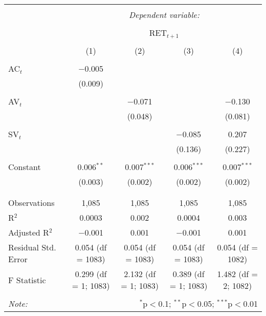 
\begin{table}[!htbp] \centering 
  \caption{} 
  \label{} 
\begin{tabular}{@{\extracolsep{5pt}}lcccc} 
\\[-1.8ex]\hline 
\hline \\[-1.8ex] 
 & \multicolumn{4}{c}{\textit{Dependent variable:}} \\ 
\cline{2-5} 
\\[-1.8ex] & \multicolumn{4}{c}{RET$_{t+1}$} \\ 
\\[-1.8ex] & (1) & (2) & (3) & (4)\\ 
\hline \\[-1.8ex] 
 AC$_{t}$ & $-$0.005 &  &  &  \\ 
  & (0.009) &  &  &  \\ 
  & & & & \\ 
 AV$_{t}$ &  & $-$0.071 &  & $-$0.130 \\ 
  &  & (0.048) &  & (0.081) \\ 
  & & & & \\ 
 SV$_{t}$ &  &  & $-$0.085 & 0.207 \\ 
  &  &  & (0.136) & (0.227) \\ 
  & & & & \\ 
 Constant & 0.006$^{**}$ & 0.007$^{***}$ & 0.006$^{***}$ & 0.007$^{***}$ \\ 
  & (0.003) & (0.002) & (0.002) & (0.002) \\ 
  & & & & \\ 
\hline \\[-1.8ex] 
Observations & 1,085 & 1,085 & 1,085 & 1,085 \\ 
R$^{2}$ & 0.0003 & 0.002 & 0.0004 & 0.003 \\ 
Adjusted R$^{2}$ & $-$0.001 & 0.001 & $-$0.001 & 0.001 \\ 
Residual Std. Error & 0.054 (df = 1083) & 0.054 (df = 1083) & 0.054 (df = 1083) & 0.054 (df = 1082) \\ 
F Statistic & 0.299 (df = 1; 1083) & 2.132 (df = 1; 1083) & 0.389 (df = 1; 1083) & 1.482 (df = 2; 1082) \\ 
\hline 
\hline \\[-1.8ex] 
\textit{Note:}  & \multicolumn{4}{r}{$^{*}$p$<$0.1; $^{**}$p$<$0.05; $^{***}$p$<$0.01} \\ 
\end{tabular} 
\end{table} 
